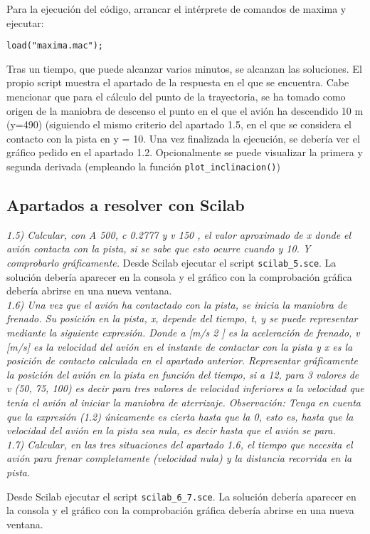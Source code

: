\documentclass[fleqn,10pt]{wlscirep}
\begin{document}
Para la ejecución del código, arrancar el intérprete de comandos de
maxima y ejecutar:

\begin{verbatim}
load("maxima.mac");
\end{verbatim}

Tras un tiempo, que puede alcanzar varios minutos, se alcanzan las
soluciones. El propio script muestra el apartado de la respuesta en el
que se encuentra. Cabe mencionar que para el cálculo del punto de la
trayectoria, se ha tomado como origen de la maniobra de descenso el
punto en el que el avión ha descendido 10 m (y=490) (siguiendo el mismo
criterio del apartado 1.5, en el que se considera el contacto con la
pista en y = 10. Una vez finalizada la ejecución, se debería ver el
gráfico pedido en el apartado 1.2. Opcionalmente se puede visualizar la
primera y segunda derivada (empleando la función
\texttt{plot\_inclinacion()})

\subsection{Apartados a resolver con
Scilab}\label{apartados-a-resolver-con-scilab}

\emph{1.5) Calcular, con A 500, c 0.2777 y v 150 , el valor aproximado
de x donde el avión contacta con la pista, si se sabe que esto ocurre
cuando y 10. Y comprobarlo gráficamente.} Desde Scilab ejecutar el
script \texttt{scilab\_5.sce}. La solución debería aparecer en la
consola y el gráfico con la comprobación gráfica debería abrirse en una
nueva ventana.\\
\emph{1.6) Una vez que el avión ha contactado con la pista, se inicia la
maniobra de frenado. Su posición en la pista, x, depende del tiempo, t,
y se puede representar mediante la siguiente expresión. Donde a {[}m/s 2
{]} es la aceleración de frenado, v {[}m/s{]} es la velocidad del avión
en el instante de contactar con la pista y x es la posición de contacto
calculada en el apartado anterior. Representar gráficamente la posición
del avión en la pista en función del tiempo, si a 12, para 3 valores de
v (50, 75, 100) es decir para tres valores de velocidad inferiores a la
velocidad que tenía el avión al iniciar la maniobra de aterrizaje.
Observación: Tenga en cuenta que la expresión (1.2) únicamente es cierta
hasta que la 0, esto es, hasta que la velocidad del avión en la pista
sea nula, es decir hasta que el avión se para.\\
1.7) Calcular, en las tres situaciones del apartado 1.6, el tiempo que
necesita el avión para frenar completamente (velocidad nula) y la
distancia recorrida en la pista.}

Desde Scilab ejecutar el script \texttt{scilab\_6\_7.sce}. La solución
debería aparecer en la consola y el gráfico con la comprobación gráfica
debería abrirse en una nueva ventana.


\end{document}
